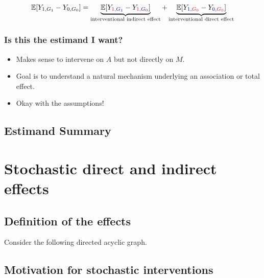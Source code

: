 \documentclass[
  12pt,
]{book}
\providecommand{\tightlist}{%
  \setlength{\itemsep}{0pt}\setlength{\parskip}{0pt}}
\theoremstyle{definition}
\theoremstyle{definition}
\theoremstyle{definition}
\newcommand{\E}{\mathbb{E}}
\newcommand{\1}{\mathbbm{1}}
\begin{document}
\begin{equation*}
  \E[Y_{1,G_1} - Y_{0,G_0}] = \underbrace{\E[Y_{\color{red}{1},
    \color{blue}{G_1}} -
    Y_{\color{red}{1},
    \color{blue}{G_0}}]}_{\text{interventional indirect effect}} +
    \underbrace{\E[Y_{\color{blue}{1},\color{red}{G_0}} -
    Y_{\color{blue}{0},
    \color{red}{G_0}}]}_{\text{interventional direct effect}}
\end{equation*}

\hypertarget{is-this-the-estimand-i-want-2}{%
\subsection{Is this the estimand I want?}\label{is-this-the-estimand-i-want-2}}

\begin{itemize}
\tightlist
\item
  Makes sense to intervene on \(A\) but not directly on \(M\).
\item
  Goal is to understand a natural mechanism underlying an association or total
  effect.
\item
  Okay with the assumptions!
\end{itemize}

\hypertarget{estimand-summary}{%
\section{Estimand Summary}\label{estimand-summary}}

\hypertarget{stochastic}{%
\chapter{Stochastic direct and indirect effects}\label{stochastic}}

\hypertarget{definition-of-the-effects}{%
\section{Definition of the effects}\label{definition-of-the-effects}}

Consider the following directed acyclic graph.

\hypertarget{motivation-for-stochastic-interventions}{%
\section{Motivation for stochastic interventions}\label{motivation-for-stochastic-interventions}}
\end{document}
